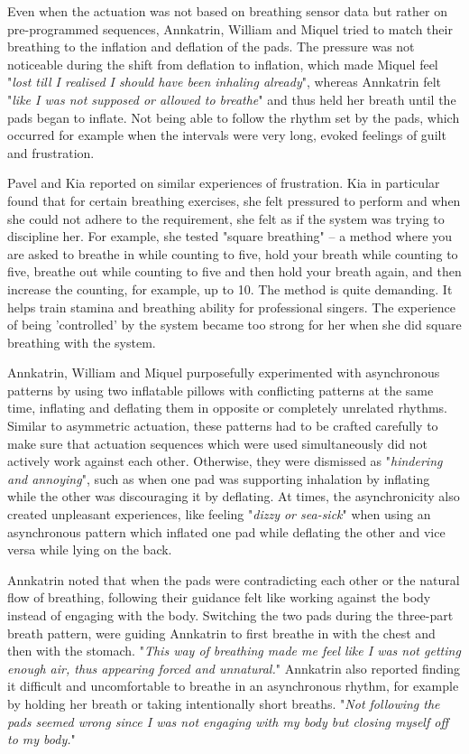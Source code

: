 Even when the actuation was not based on breathing sensor data but rather on pre-programmed sequences, Annkatrin, William and Miquel tried to match their breathing to the inflation and deflation of the pads. The pressure was not noticeable during the shift from deflation to inflation, which made Miquel feel "\textit{lost till I realised I should have been inhaling already}", whereas Annkatrin felt "\textit{like I was not supposed or allowed to breathe}" and thus held her breath until the pads began to inflate. Not being able to follow the rhythm set by the pads, which occurred for example when the intervals were very long, evoked feelings of guilt and frustration.

Pavel and Kia reported on similar experiences of frustration. Kia in particular found that for certain breathing exercises, she felt pressured to perform and when she could not adhere to the requirement, she felt as if the system was trying to discipline her. For example, she tested "square breathing" -- a method where you are asked to breathe in while counting to five, hold your breath while counting to five, breathe out while counting to five and then hold your breath again, and then increase the counting, for example, up to 10. The method is quite demanding. It helps train stamina and breathing ability for professional singers. The experience of being 'controlled' by the system became too strong for her when she did square breathing with the system.   

Annkatrin, William and Miquel purposefully experimented with asynchronous patterns by using two inflatable pillows with conflicting patterns at the same time, inflating and deflating them in opposite or completely unrelated rhythms. Similar to asymmetric actuation, these patterns had to be crafted carefully to make sure that actuation sequences which were used simultaneously did not actively work against each other. Otherwise, they were dismissed as "\textit{hindering and annoying}", such as when one pad was supporting inhalation by inflating while the other was discouraging it by deflating. At times, the asynchronicity also created unpleasant experiences, like feeling "\textit{dizzy or sea-sick}" when using an asynchronous pattern which inflated one pad while deflating the other and vice versa while lying on the back.

Annkatrin noted that when the pads were contradicting each other or the natural flow of breathing, following their guidance felt like working against the body instead of engaging with the body. Switching the two pads during the three-part breath pattern, were guiding Annkatrin to first breathe in with the chest and then with the stomach. "\textit{This way of breathing made me feel like I was not getting enough air, thus appearing forced and unnatural.}" Annkatrin also reported finding it difficult and uncomfortable to breathe in an asynchronous rhythm, for example by holding her breath or taking intentionally short breaths. "\textit{Not following the pads seemed wrong since I was not engaging with my body but closing myself off to my body.}"

